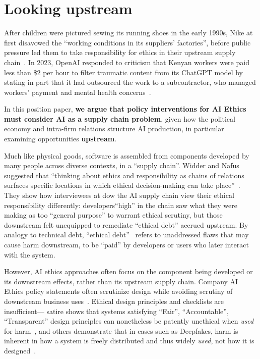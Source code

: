 \documentclass[nonacm]{acmart}
\begin{document}
\section{Looking upstream}
After children were pictured sewing its running shoes in the early 1990s, Nike at first disavowed the ``working conditions in its suppliers’ factories'', before public pressure led them to take responsibility for ethics in their upstream supply chain~\cite{doorey2011transparent}. 
In 2023, OpenAI responded to criticism that Kenyan workers were paid less than \$2 per hour to filter traumatic content from its ChatGPT model by stating in part that it had outsourced the work to a subcontractor, who managed workers' payment and mental health concerns~\cite{2023exclusive}.

In this position paper,\textbf{ we argue that policy interventions for AI Ethics must consider AI as a supply chain problem}, given how the political economy and intra-firm relations structure AI production, in particular examining opportunities \textbf{upstream}. 

Much like physical goods, software is assembled from components developed by many people across diverse contexts, in a ``supply chain''.
Widder and Nafus suggested that ``thinking about ethics and responsibility as chains of relations surfaces specific locations in which ethical decision-making can take place''~\cite{widder2022dislocateda}. They show how interviewees at dow the AI supply chain view their ethical responsibility differently:  developers``high''  in the chain saw what they were making as too ``general purpose'' to warrant ethical scrutiny, but those downstream felt unequipped to remediate ``ethical debt'' accrued upstream.
By analogy to technical debt, ``ethical debt''~\cite{ethicaldebt2020fiesler} refers to unaddressed flaws that may cause harm downstream, to be ``paid'' by developers or users who later interact with the system.

However, AI ethics approaches often focus on the component being developed or its downstream effects, rather than its upstream supply chain. Company AI Ethics policy statements often scrutinize design while avoiding scrutiny of downstream business uses~\cite{greene2019better}. Ethical design principles and checklists are insufficient--- satire shows that systems satisfying ``Fair'', ``Accountable'', ``Transparent'' design principles can nonetheless be patently unethical when \textit{used} for harm~\cite{keyes2019mulching}, and others demonstrate that in cases such as Deepfakes, harm is inherent in how a system is freely distributed and thus widely \textit{used}, not how it is designed~\cite{widder2022limits}. 
\end{document}
